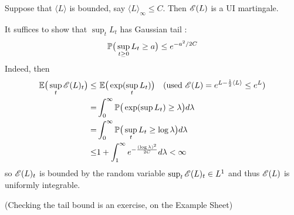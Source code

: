 \documentclass[12pt,a4paper]{article}
\newenvironment{proof}
{\begin{changemargin}{0.5cm}{0.5cm} 
	}%
	{\end{changemargin}
}
\newenvironment{p}
{\begin{proof} 
	}%
	{\end{proof}
}
\begin{document}
\prop Suppose that $\langle L \rangle$ is bounded, say $\langle L \rangle_{\infty} \leq C$. Then $\mathscr{E}(L)$ is a UI martingale.
\begin{p}
\pf It suffices to show that $\sup_t L_t$ has Gaussian tail :
\begin{align*}
\mathbb{P} \big( \sup_{t\geq 0} L_t \geq a \big) \leq e^{-a^2 /2C}
\end{align*}
Indeed, then
\begin{align*}
\mathbb{E} \big(  \sup_t \mathscr{E}(L)_t \big) \leq& \,\, \mathbb{E} \big( \exp (\sup_t L_t ) \big) \quad (\text{used } \mathscr{E}(L) = e^{L - \frac{1}{2} \langle L \rangle}  \leq e^L) \\
=& \int_0^{\infty} \mathbb{P} \big( \exp (\sup L_t) \geq \lambda \big) d\lambda \\
=& \int_0^{\infty} \mathbb{P} \big( \sup_t L_t \geq \log \lambda \big) d\lambda \\
\leq& 1+ \int_1^{\infty} e^{- \frac{(\log \lambda)^2}{2C}} d\lambda < \infty
\end{align*}
so $\mathscr{E}(L)_t$ is bounded by the random variable $\sup_t \mathscr{E}(L)_t \in L^1$ and thus $\mathscr{E}(L)$ is uniformly integrable.
\s

(Checking the tail bound is an exercise, on the Example Sheet)


\end{p}
\end{document}
